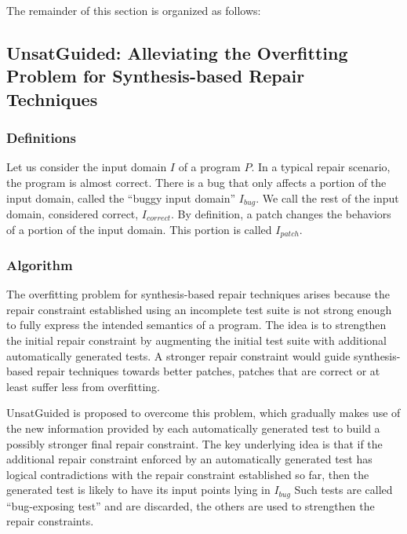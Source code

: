 The remainder of this section is organized as follows:

\subsection{UnsatGuided: Alleviating the Overfitting Problem for Synthesis-based Repair Techniques}
\label{subsec:transversal-contributions:test-for-repair:definitions}

\subsubsection{Definitions}
\label{subsubsec:transversal-contributions:test-for-repair:unsat-guided:definitions}

Let us consider the input domain $I$ of a program $P$.
In a typical repair scenario, the program is almost correct.
There is a bug that only affects a portion of the input domain, called the ``buggy input domain'' $I_{bug}$.
We call the rest of the input domain, considered correct, $I_{correct}$. 
By definition, a patch changes the behaviors of a portion of the input domain.
This portion is called $I_{patch}$.

\subsubsection{Algorithm}
\label{subsubsec:transversal-contributions:test-for-repair:unsat-guided:algo}

The overfitting problem for synthesis-based repair techniques arises because the repair constraint established using an incomplete test suite is not strong enough to fully express the intended semantics of a program.
The idea is to strengthen the initial repair constraint by augmenting the initial test suite with additional automatically generated tests. 
A stronger repair constraint would guide synthesis-based repair techniques towards better patches, \ie patches that are correct or at least suffer less from overfitting.

UnsatGuided is proposed to overcome this problem, which gradually makes use of the new information provided by each automatically generated test to build a possibly stronger final repair constraint. 
The key underlying idea is that if the additional repair constraint enforced by an automatically generated test has logical contradictions with the repair constraint established so far, then the generated test is likely to have its input points lying in $I_{bug}$
Such tests are called ``bug-exposing test'' and are discarded, the others are used to strengthen the repair constraints.

